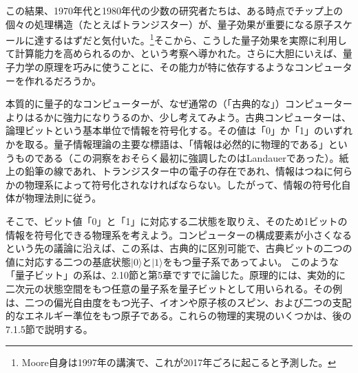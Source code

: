 この結果、1970年代と1980年代の少数の研究者たちは、ある時点でチップ上の個々の処理構造（たとえばトランジスター）が、量子効果が重要になる原子スケールに達するはずだと気付いた。\footnote{Moore自身は1997年の講演で、これが2017年ごろに起こると予測した\cite{ref324}。}そこから、こうした量子効果を実際に利用して計算能力を高められるのか、という考察へ導かれた。さらに大胆にいえば、量子力学の原理を巧みに使うことに、その能力が特に依存するようなコンピューターを作れるだろうか。

本質的に量子的なコンピューターが、なぜ通常の（「古典的な」）コンピューターよりはるかに強力になりうるのか、少し考えてみよう。古典コンピューターは、論理ビットという基本単位で情報を符号化する。その値は「0」か「1」のいずれかを取る。量子情報理論の主要な標語は、「情報は必然的に物理的である」というものである（この洞察をおそらく最初に強調したのはLandauer\cite{ref325}であった）。紙上の鉛筆の線であれ、トランジスター中の電子の存在であれ、情報はつねに何らかの物理系によって符号化されなければならない。したがって、情報の符号化自体が物理法則に従う。

そこで、ビット値「0」と「1」に対応する二状態を取りえ、そのため1ビットの情報を符号化できる物理系を考えよう。コンピューターの構成要素が小さくなるという先の議論に沿えば、この系は、古典的に区別可能で、古典ビットの二つの値に対応する二つの基底状態$|0\rangle$と$|1\rangle$をもつ量子系であってよい。
\hypertarget{srcpage:295}{}\label{srcpage:295}
このような「量子ビット」の系は、2.10節と第5章ですでに論じた。原理的には、実効的に二次元の状態空間をもつ任意の量子系を量子ビットとして用いられる。その例は、二つの偏光自由度をもつ光子、イオンや原子核のスピン、および二つの支配的なエネルギー準位をもつ原子である。これらの物理的実現のいくつかは、後の7.1.5節で説明する。

